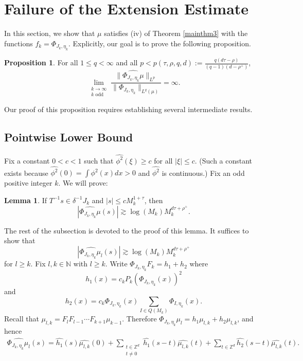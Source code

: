 \documentclass{amsart}
\numberwithin{equation}{section}
\theoremstyle{definition}
\newtheorem{lemma}[theorem]{Lemma}
\newtheorem{prop}[theorem]{Proposition}
\theoremstyle{definition}
\def\ZZ{\mathbb{Z}}
\def\NN{\mathbb{N}}
\begin{document}
\section{Failure of the Extension Estimate}\label{sec_Failure_Estimate}

In this section, we show that $\mu$ satisfies (iv) of Theorem \ref{mainthm3} with the functions $f_k = \Phi_{J_k, \eta_k}$. 
Explicitly, our goal is to prove the following proposition. 

\begin{prop}\label{res fail prop}
For all $1 \leq q < \infty$ and all $p < p(\tau, \rho, q, d) := \frac{q(d \tau - \rho)}{(q-1) (d-\rho^+)}$, 
$$
\lim_{\substack{k \to \infty \\ k \text{ odd}}} \dfrac{\|\widehat{\Phi_{J_k,\eta_k} \mu}\|_{L^p}}{\|\Phi_{J_k,\eta_k}\|_{L^q(\mu)}} = \infty.
$$
\end{prop}


Our proof of this proposition requires establishing several intermediate results.  

\subsection{Pointwise Lower Bound}\label{Pointwise Lower Bound}



Fix a constant $0 < c < 1$ such that $\widehat{\phi^2}(\xi) \geq c$ for all $|\xi| \leq c$. (Such a constant exists because $\widehat{\phi^2}(0) = \int \phi^2(x) dx > 0$ and $\widehat{\phi^2}$ is continuous.)  
%
Fix an odd positive integer $k$. 
We will prove:  

\begin{lemma}\label{lem_lb_fkmu}
If $T^{-1} s \in \delta^{-1} J_k$ and $|s| \leq c M_k^{1 + \tau}$, then 
\begin{equation}\label{eq_lb_fkmu}
\left|\widehat{\Phi_{J_k, \eta_k} \mu}(s)\right| \gtrsim \log(M_k) 
M_k^{d \tau+\rho^+}.
\end{equation}
\end{lemma}

The rest of the subsection is devoted to the proof of this lemma. It suffices to show that 
\begin{equation}\label{f_kmu_l_lb}
|\widehat{\Phi_{J_k, \eta_k} \mu_l} (s)| \gtrsim \log(M_k) 
M_k^{d \tau+\rho^+} 
\end{equation}
for $l \geq k$. 
%
Fix $l, k \in \NN$ with $l \geq k$. 
%
Write $\Phi_{J_k, \eta_k}F_k = h_1+h_2$ where
$$
h_1(x) = c_k P_k (\Phi_{J_k, \eta_k}(x))^2
$$
and
$$
h_2(x) = c_k \Phi_{J_k, \eta_k}(x) \sum_{I \in Q(M_k)} \Phi_{I, \eta_k}(x).
$$
Recall that 
$\mu_{l,k} = F_l F_{l-1} \cdots F_{k+1} \mu_{k-1}$. 
Therefore  $\Phi_{J_k, \eta_k} \mu_l  = h_1 \mu_{l,k} + h_2 \mu_{l,k}$, and hence 
\begin{align}\label{phi mu decomp}
\widehat{\Phi_{J_k, \eta_k} \mu_l}(s)
=
\widehat{h_1}(s) \widehat{\mu_{l,k}}(0)
+
\sum_{\substack{t \in \ZZ^d \\  t \neq 0}} \widehat{h_1}(s-t) \widehat{\mu_{l,k}}(t)
+
\sum_{t \in \ZZ^d} \widehat{h_2}(s-t) \widehat{\mu_{l,k}}(t). 
\end{align}
\end{document}
